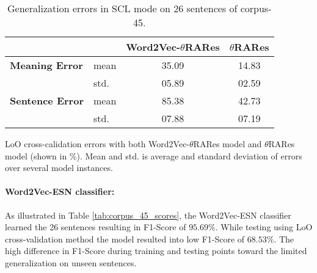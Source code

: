 \begin{table}[H]
\centering
\begin{threeparttable}
\caption[Cross-Validation errors with Word2Vec-$\theta$RARes on limited number of sentences]{Generalization errors in SCL mode on 26 sentences of corpus-45.}
\label{tab:corpus_45_errors}
\begin{tabular}{llcc}
\toprule
  	 		    		& 		 	&  Word2Vec-$\theta$RARes 	& $\theta$RARes \\
\midrule                 
\textbf{Meaning Error}	& mean 		& 35.09  					& 14.83  \\
						& std. 		& 05.89 					& 02.59  \\
\textbf{Sentence Error}	& mean 		& 85.38  					& 42.73 \\
						& std. 		& 07.88 					& 07.19 \\
\bottomrule
\end{tabular}
\begin{tablenotes}
\small
\item 
LoO cross-calidation errors with both Word2Vec-$\theta$RARes model and $\theta$RARes model (shown in \%). Mean and std. is average and standard deviation of errors over several model instances.
\end{tablenotes}
\end{threeparttable}
\end{table}

\paragraph{Word2Vec-ESN classifier:} As illustrated in Table \ref{tab:corpus_45_scores}, the Word2Vec-ESN classifier learned the 26 sentences resulting in F1-Score of $95.69\%$. While testing using LoO cross-validation method the model resulted into low F1-Score of $68.53\%$. The high difference in F1-Score during training and testing points toward the limited generalization on unseen sentences. 

